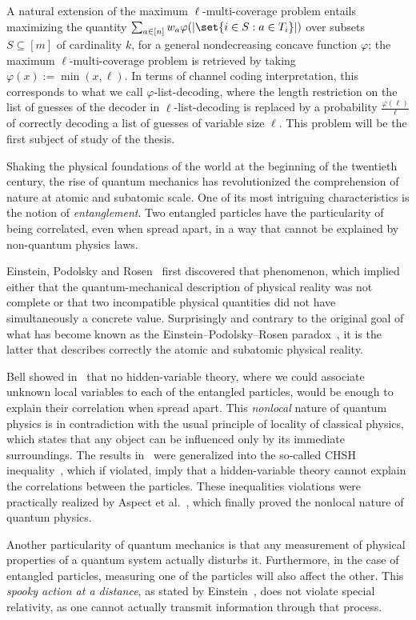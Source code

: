 A natural extension of the maximum $\ell$-multi-coverage problem entails maximizing the quantity $\sum_{a \in [n]}  w_a\varphi(\abs{\set{i \in S : a \in T_i}})$ over subsets $S \subseteq [m]$ of cardinality $k$, for a general nondecreasing concave function $\varphi$; the  maximum $\ell$-multi-coverage problem is retrieved by taking $\varphi(x) := \min(x,\ell)$. In terms of channel coding interpretation, this corresponds to what we call $\varphi$-list-decoding, where the length restriction on the list of guesses of the decoder in $\ell$-list-decoding is replaced by a probability $\frac{\varphi(\ell)}{\ell}$ of correctly decoding a list of guesses of variable size $\ell$. This problem will be the first subject of study of the thesis.

Shaking the physical foundations of the world at the beginning of the twentieth century, the rise of quantum mechanics has revolutionized the comprehension of nature at atomic and subatomic scale. One of its most intriguing characteristics is the notion of \emph{entanglement}. Two entangled particles have the particularity of being correlated, even when spread apart, in a way that cannot be explained by non-quantum physics laws.

Einstein, Podolsky and Rosen~\cite{EPR35} first discovered that phenomenon, which implied either that the quantum-mechanical description of physical reality was not complete or that two incompatible physical quantities did not have simultaneously a concrete value. Surprisingly and contrary to the original goal of what has become known as the Einstein–Podolsky–Rosen paradox~\cite{EPR35}, it is the latter that describes correctly the atomic and subatomic physical reality.

Bell showed in~\cite{Bell64} that no hidden-variable theory, where we could associate unknown local variables to each of the entangled particles, would be enough to explain their correlation when spread apart. This \emph{nonlocal} nature of quantum physics is in contradiction with the usual principle of locality of classical physics, which states that any object can be influenced only by its immediate surroundings. The results in~\cite{Bell64} were generalized into the so-called CHSH inequality~\cite{CHSH69}, which if violated, imply that a hidden-variable theory cannot explain the correlations between the particles. These inequalities violations were practically realized by Aspect et al.~\cite{ADG82}, which finally proved the nonlocal nature of quantum physics.

Another particularity of quantum mechanics is that any measurement of physical properties of a quantum system actually disturbs it. Furthermore, in the case of entangled particles, measuring one of the particles will also affect the other. This \emph{spooky action at a distance}, as stated by Einstein~\cite{Born71}, does not violate special relativity, as one cannot actually transmit information through that process. %

